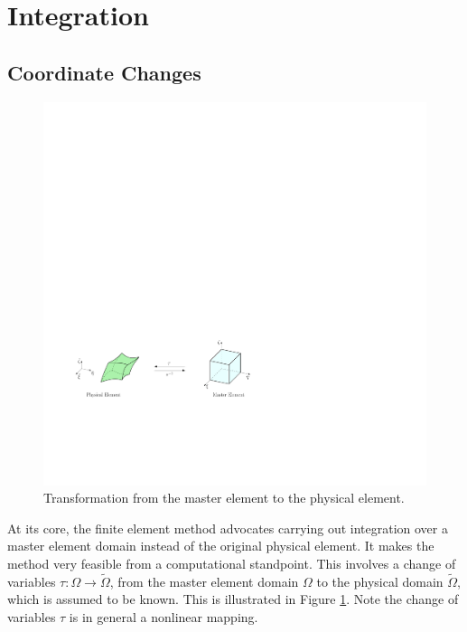 \section{Integration}
\label{app:Integration}

\subsection{Coordinate Changes}

\begin{figure}[!ht]
\begin{center}
\includegraphics[scale=0.45]{./figures/CurvilinearTransform.pdf}
\caption{Transformation from the master element to the physical element.}\label{fig:curvilineartransform}
\end{center}
\end{figure}

At its core, the finite element method advocates carrying out integration over a master element domain instead of the original physical element.
It makes the method very feasible from a computational standpoint.
This involves a change of variables $\tau:\Omega\rightarrow\tilde{\Omega}$, from the master element domain $\Omega$ to the physical domain $\tilde{\Omega}$, which is assumed to be known.
This is illustrated in Figure \ref{fig:curvilineartransform}.
Note the change of variables $\tau$ is in general a nonlinear mapping.

